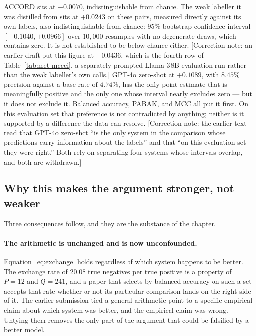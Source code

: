 ACCORD sits at $-0.0070$, indistinguishable from chance. The weak labeller it was
distilled from sits at $+0.0243$ on these pairs, measured directly against its
own labels, also indistinguishable from chance: $95\%$ bootstrap confidence
interval $[-0.1040, +0.0966]$ over $10{,}000$ resamples with no degenerate
draws, which contains zero. It is not established to be below chance either. [Correction note: an
earlier draft put this figure at $-0.0436$, which is the fourth row of
Table~\ref{tab:met-mccci}, a separately prompted Llama 3\,8B evaluation run
rather than the weak labeller's own calls.] GPT-4o zero-shot at $+0.1089$, with
$8.45\%$ precision against a base rate of $4.74\%$, has the only point estimate
that is meaningfully positive and the only one whose interval nearly excludes
zero --- but it does not exclude it. Balanced accuracy, PABAK, and MCC all put it
first. On this evaluation set that preference is not contradicted by anything;
neither is it supported by a difference the data can resolve. [Correction note:
the earlier text read that GPT-4o zero-shot ``is the only system in the
comparison whose predictions carry information about the labels'' and that ``on
this evaluation set they were right.'' Both rely on separating four systems whose
intervals overlap, and both are withdrawn.]

\subsection{Why this makes the argument stronger, not weaker}

Three consequences follow, and they are the substance of the chapter.

\paragraph{The arithmetic is unchanged and is now unconfounded.}
Equation~\eqref{eq:exchange} holds regardless of which system happens to be
better. The exchange rate of $20.08$ true negatives per true positive is a
property of $P = 12$ and $Q = 241$, and a paper that selects by balanced
accuracy on such a set accepts that rate whether or not its particular
comparison lands on the right side of it. The earlier submission tied a general
arithmetic point to a specific empirical claim about which system was better,
and the empirical claim was wrong. Untying them removes the only part of the
argument that could be falsified by a better model.

